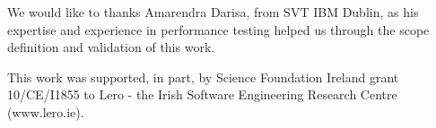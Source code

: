 \documentclass[runningheads,a4paper]{llncs}
\begin{document}
We would like to thanks Amarendra Darisa, from SVT IBM Dublin, as his expertise
and experience in performance testing helped us through the scope definition and validation of this work.

This work was supported, in part, by Science Foundation Ireland grant 10/CE/I1855 to Lero - the Irish Software Engineering Research Centre (www.lero.ie).




\end{document}
